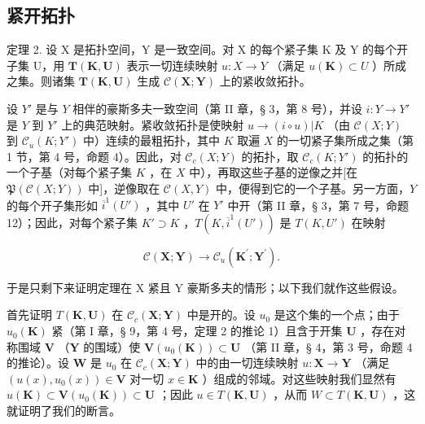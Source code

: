 \subsection{紧开拓扑}

定理 2. 设 X 是拓扑空间，Y 是一致空间。对 X 的每个紧子集 K 及 Y 的每个开子集 U，用 \(\mathbf{T}(\mathbf{K},\mathbf{U})\) 表示一切连续映射 \(u:X\to Y\) （满足 \(u(\mathbf{K})\subset U\) ）所成之集。则诸集 \(\mathbf{T}(\mathbf{K},\mathbf{U})\) 生成 \(\mathcal{C}(\mathbf{X};\mathbf{Y})\) 上的紧收敛拓扑。

设 \(Y'\) 是与 \(Y\) 相伴的豪斯多夫一致空间（第 II 章，§ 3，第 8 号），并设 \(i: Y \to Y'\) 是 \(Y\) 到 \(Y'\) 上的典范映射。紧收敛拓扑是使映射 \(u \to (i \circ u)|K\) （由 \(\mathcal{C}(X; Y)\) 到 \(\mathcal{C}_u(K; Y')\) 中）连续的最粗拓扑，其中 \(K\) 取遍 \(X\) 的一切紧子集所成之集（第 1 节，第 4 号，命题 4）。因此，对 \(\mathcal{C}_c(X; Y)\) 的拓扑，取 \(\mathcal{C}_c(K; Y')\) 的拓扑的一个子基（对每个紧子集 \(K\) ，在 \(X\) 中），再取这些子基的逆像之并{[}在 \(\mathfrak{P}(\mathcal{C}(X; Y))\) 中{]}，逆像取在 \(\mathcal{C}(X, Y)\) 中，便得到它的一个子基。另一方面，\(Y\) 的每个开子集形如 \(\overline{i}^1(U')\) ，其中 \(U'\) 在 \(Y'\) 中开（第 II 章，§ 3，第 7 号，命题 12）；因此，对每个紧子集 \(K' \supset K\) ，\(T(K, \overline{i}^1(U'))\) 是 \(T(K, U')\) 在映射

\[
\mathcal {C} (\mathbf {X}; \mathbf {Y}) \rightarrow \mathcal {C} _ {u} (\mathbf {K} ^ {\prime}; \mathbf {Y} ^ {\prime}).
\]

于是只剩下来证明定理在 X 紧且 Y 豪斯多夫的情形；以下我们就作这些假设。

首先证明 \(T(\mathbf{K}, \mathbf{U})\) 在 \(\mathcal{C}_c(\mathbf{X}; \mathbf{Y})\) 中是开的。设 \(u_0\) 是这个集的一个点；由于 \(u_0(\mathbf{K})\) 紧（第 I 章，§ 9，第 4 号，定理 2 的推论 1）且含于开集 \(\mathbf{U}\) ，存在对称围域 \(\mathbf{V}\) （\(\mathbf{Y}\) 的围域）使 \(\mathbf{V}(u_0(\mathbf{K})) \subset \mathbf{U}\) （第 II 章，§ 4，第 3 号，命题 4 的推论）。设 \(\mathbf{W}\) 是 \(u_0\) 在 \(\mathcal{C}_c(\mathbf{X}; \mathbf{Y})\) 中的由一切连续映射 \(u: \mathbf{X} \to \mathbf{Y}\) （满足 \((u(x), u_0(x)) \in \mathbf{V}\) 对一切 \(x \in \mathbf{K}\) ）组成的邻域。对这些映射我们显然有 \(u(\mathbf{K}) \subset \mathbf{V}(u_0(\mathbf{K})) \subset \mathbf{U}\) ；因此 \(u \in T(\mathbf{K}, \mathbf{U})\) ，从而 \(W \subset T(\mathbf{K}, \mathbf{U})\) ，这就证明了我们的断言。

